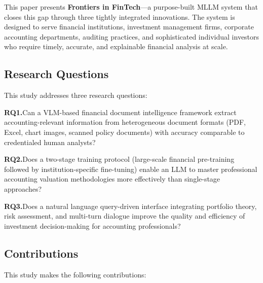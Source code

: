 \documentclass[12pt,letterpaper]{article}
\begin{document}
This paper presents \textbf{Frontiers in FinTech}---a purpose-built MLLM system
that closes this gap through three tightly integrated innovations.
The system is designed to serve financial institutions, investment
management firms, corporate accounting departments, auditing practices,
and sophisticated individual investors who require timely, accurate,
and explainable financial analysis at scale.

\subsection{Research Questions}

This study addresses three research questions:

\begin{tcolorbox}[rqbox]
\textbf{\color{aaa-blue}RQ1.}\quad Can a VLM-based financial document
intelligence framework extract accounting-relevant information from
heterogeneous document formats (PDF, Excel, chart images, scanned
policy documents) with accuracy comparable to credentialed human
analysts?
\end{tcolorbox}

\begin{tcolorbox}[rqbox]
\textbf{\color{aaa-blue}RQ2.}\quad Does a two-stage training protocol
(large-scale financial pre-training followed by institution-specific
fine-tuning) enable an LLM to master professional accounting valuation
methodologies more effectively than single-stage approaches?
\end{tcolorbox}

\begin{tcolorbox}[rqbox]
\textbf{\color{aaa-blue}RQ3.}\quad Does a natural language query-driven
interface integrating portfolio theory, risk assessment, and multi-turn
dialogue improve the quality and efficiency of investment decision-making
for accounting professionals?
\end{tcolorbox}

\subsection{Contributions}

This study makes the following contributions:
\end{document}
